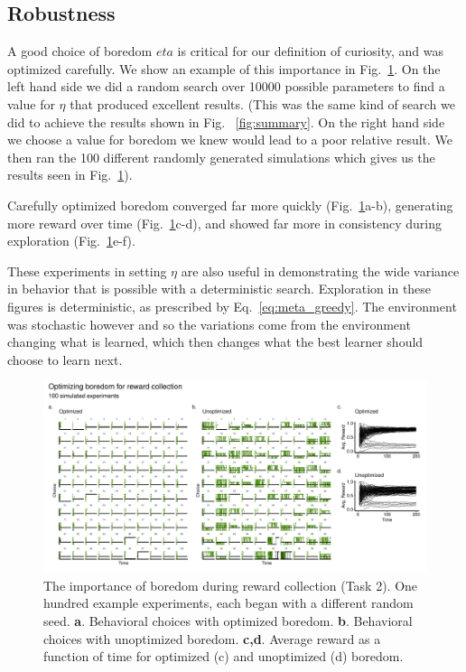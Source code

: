 \subsection{Robustness}
A good choice of boredom $eta$ is critical for our definition of curiosity, and was optimized carefully. We show an example of this importance in Fig.~\ref{fig:boredom2}. On the left hand side we did a random search over 10000 possible parameters to find a value for $\eta$ that produced excellent results. (This was the same kind of search we did to achieve the results shown in Fig. ~\ref{fig:summary}. On the right hand side we choose a value for boredom we knew would lead to a poor relative result. We then ran the 100 different randomly generated simulations which gives us the results seen in Fig.~\ref{fig:boredom2}). 

Carefully optimized boredom converged far more quickly (Fig.~\ref{fig:boredom2}a-b), generating more reward over time (Fig.~\ref{fig:boredom2}c-d), and showed far more in consistency during exploration (Fig.~\ref{fig:boredom2}e-f). 

These experiments in setting $\eta$ are also useful in demonstrating the wide variance in behavior that is possible with a deterministic search. Exploration in these figures is deterministic, as prescribed by Eq.~\ref{eq:meta_greedy}. The environment was stochastic however and so the variations come from the environment changing what is learned, which then changes what the best learner should choose to learn next. 

\begin{figure}
	\begin{fullwidth}
	\includegraphics[width=.9\linewidth]{img/boredom2.pdf} 
	\caption{The importance of boredom during reward collection (Task 2). One hundred example experiments, each began with a different random seed. 
	\textbf{a}. Behavioral choices with optimized boredom.
	\textbf{b}. Behavioral choices with unoptimized boredom.
	\textbf{c,d}. Average reward as a function of time for optimized (c) and unoptimized (d) boredom.
	}
	\label{fig:boredom2} 
	\end{fullwidth}
\end{figure}

